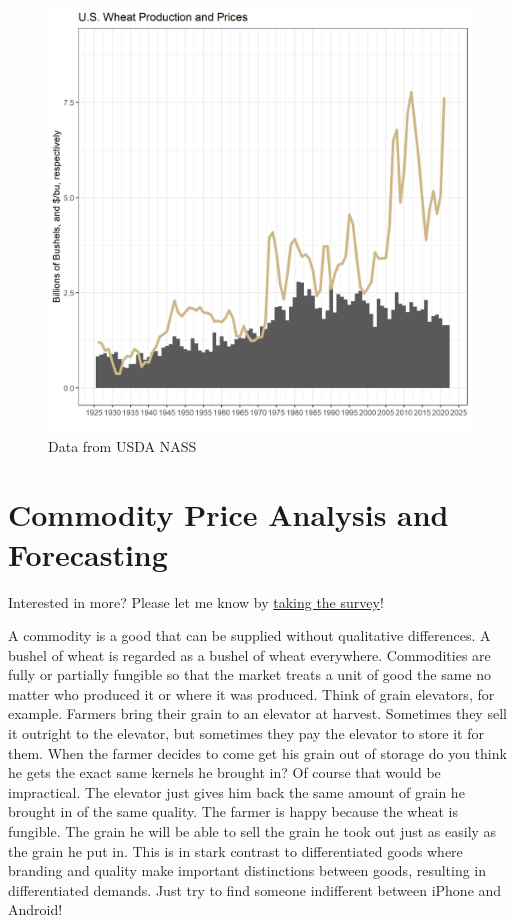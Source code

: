 \documentclass[
  letterpaper,
  DIV=11,
  numbers=noendperiod]{scrreprt}
\begin{document}
\begin{figure}[H]

{\centering \includegraphics{assets/PrimerforGrain_WheatProdand$.png}

}

\caption{Data from USDA NASS}

\end{figure}%


\chapter{Commodity Price Analysis and
Forecasting}\label{commodity-price-analysis-and-forecasting}

{Interested in more? Please let me know by}
\href{https://forms.gle/Q3VByCQZHjfQSy9D7}{taking the survey}!

A commodity is a good that can be supplied without qualitative
differences. A bushel of wheat is regarded as a bushel of wheat
everywhere. Commodities are fully or partially fungible so that the
market treats a unit of good the same no matter who produced it or where
it was produced. Think of grain elevators, for example. Farmers bring
their grain to an elevator at harvest. Sometimes they sell it outright
to the elevator, but sometimes they pay the elevator to store it for
them. When the farmer decides to come get his grain out of storage do
you think he gets the exact same kernels he brought in? Of course that
would be impractical. The elevator just gives him back the same amount
of grain he brought in of the same quality. The farmer is happy because
the wheat is fungible. The grain he will be able to sell the grain he
took out just as easily as the grain he put in. This is in stark
contrast to differentiated goods where branding and quality make
important distinctions between goods, resulting in differentiated
demands. Just try to find someone indifferent between iPhone and
Android!
\end{document}
